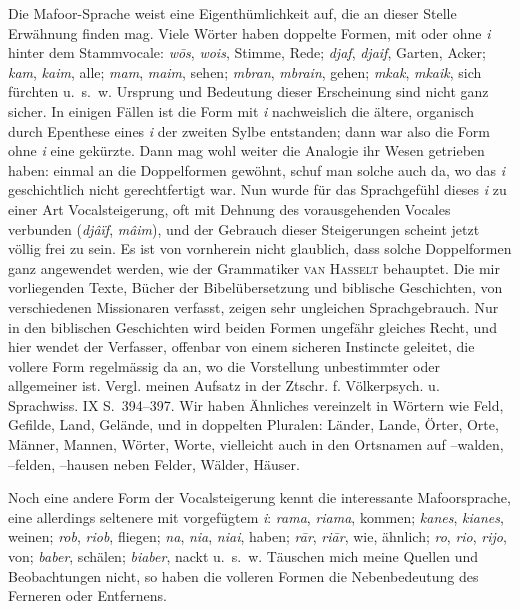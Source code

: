 Die Mafoor-Sprache weist  eine Eigenthümlichkeit auf, die an dieser Stelle Erwähnung finden mag. Viele Wörter haben doppelte Formen, mit oder ohne \textit{i} hinter dem Stammvocale: \textit{wōs}, \textit{wois}, Stimme, Rede; \textit{djaf}, \textit{djaif}, Garten, Acker; \textit{kam}, \textit{kaim}, alle; \textit{mam}, \textit{maim}, sehen; \textit{mbran}, \textit{mbrain}, gehen; \textit{mkak}, \textit{mkaik}, sich fürchten u.~s.~w. Ursprung und Bedeutung dieser Erscheinung sind nicht ganz sicher. In einigen Fällen ist die Form mit \textit{i} nachweislich die ältere, organisch durch Epenthese eines \textit{i} der zweiten Sylbe entstanden; dann war also die Form ohne \textit{i} eine gekürzte. Dann mag wohl weiter die Analogie ihr Wesen getrieben haben: einmal an die Doppelformen gewöhnt, schuf man solche auch da, wo das \textit{i} geschichtlich nicht gerechtfertigt war. Nun wurde für das Sprachgefühl dieses \textit{i} zu einer Art Vocalsteigerung, oft mit Dehnung des vorausgehenden Vocales verbunden (\textit{djâïf}, \textit{mâim}), und der Gebrauch dieser Steigerungen scheint jetzt völlig frei zu sein. Es ist von vornherein nicht glaublich, dass solche \label{sp.444} Doppelformen ganz  angewendet werden, wie der Grammatiker \textsc{van Hasselt} behauptet. Die mir vorliegenden Texte, Bücher der Bibelübersetzung und biblische Geschichten, von verschiedenen Missionaren verfasst, zeigen sehr ungleichen Sprachgebrauch. Nur in den biblischen Geschichten wird \label{fp.423} beiden Formen ungefähr gleiches Recht, und hier wendet der Verfasser, offenbar von einem sicheren Instincte geleitet, die vollere Form regelmässig da an, wo die Vorstellung unbestimmter oder allgemeiner ist. Vergl. meinen Aufsatz in der Ztschr. f. Völkerpsych. u. Sprachwiss. IX S.~394–397. Wir haben Ähnliches vereinzelt in Wörtern wie Feld, Gefilde, Land, Gelände, und in doppelten Pluralen: Länder, Lande, Örter, Orte, Männer, Mannen, Wörter, Worte, vielleicht auch in den Ortsnamen auf –walden, –felden, –hausen neben Felder, Wälder, Häuser.

Noch eine andere Form der Vocalsteigerung kennt die interessante Mafoorsprache, eine allerdings seltenere mit vorgefügtem \textit{i}: \textit{rama}, \textit{riama}, kommen; \textit{kanes}, \textit{kianes}, weinen; \textit{rob}, \textit{riob}, fliegen; \textit{na}, \textit{nia}, \textit{niai}, haben; \textit{rār}, \textit{riār}, wie, ähnlich; \textit{ro}, \textit{rio}, \textit{rijo}, von; \textit{baber}, schälen; \textit{biaber}, nackt u.~s.~w. Täuschen mich meine Quellen und Beobachtungen nicht, so haben die volleren Formen die Nebenbedeutung des Ferneren oder Entfernens.

